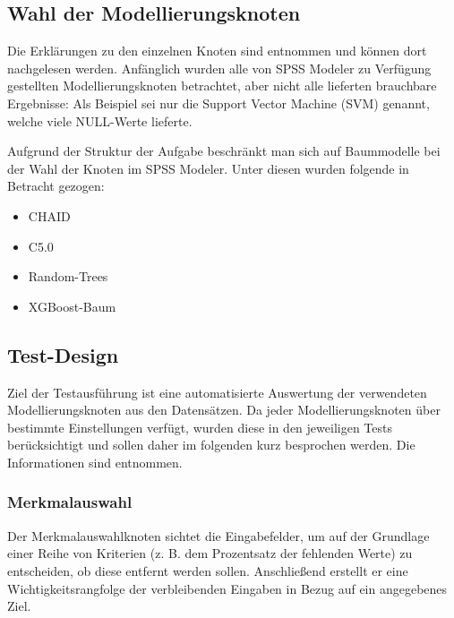 \documentclass[a4paper,12pt]{article}
\newcounter{Beispiel}
\begin{document}
\subsection{Wahl der Modellierungsknoten}
Die Erklärungen zu den einzelnen Knoten sind \cite{nodes} entnommen und können dort nachgelesen werden. 
Anfänglich  wurden alle von SPSS Modeler zu Verfügung gestellten Modellierungsknoten betrachtet, aber nicht alle lieferten brauchbare
Ergebnisse: Als Beispiel sei nur die Support Vector Machine (SVM) genannt, welche viele NULL-Werte lieferte.
\par
Aufgrund der Struktur der Aufgabe beschränkt man sich auf Baummodelle bei der Wahl der Knoten im SPSS Modeler. Unter diesen wurden folgende in Betracht gezogen:
\par
\vspace{1cm}
\begin{minipage}[h]{.5\textwidth}
\begin{flushleft}
\begin{itemize}
\item CHAID
\item C5.0
\end{itemize}
\end{flushleft}
\end{minipage}
\hfill
\begin{minipage}[h]{.5\textwidth}
\begin{flushright}
\begin{itemize}
	\item Random-Trees
	\item XGBoost-Baum
\end{itemize} 
\end{flushright}
\end{minipage}
\par
\vspace{1cm}
\par

\subsection{Test-Design}
Ziel der Testausführung ist eine automatisierte Auswertung der verwendeten Modellierungsknoten aus den Datensätzen. Da jeder Modellierungsknoten über bestimmte Einstellungen verfügt, wurden diese in den jeweiligen Tests berücksichtigt und sollen daher im folgenden kurz besprochen werden. Die Informationen sind \cite{nodes} entnommen.

\subsubsection{Merkmalauswahl}
Der Merkmalauswahlknoten sichtet die Eingabefelder, um auf der Grundlage einer Reihe von
Kriterien (z. B. dem Prozentsatz der fehlenden Werte) zu entscheiden, ob diese entfernt werden sollen. 
Anschließend erstellt er eine Wichtigkeitsrangfolge der verbleibenden Eingaben in Bezug auf ein angegebenes Ziel. 
\end{document}
